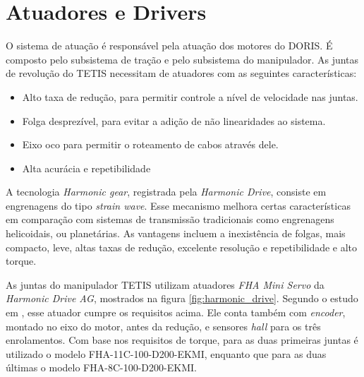 \section{Atuadores e Drivers}

O sistema de atuação é responsável pela atuação dos motores do DORIS. É composto pelo subsistema de tração e pelo subsistema do manipulador. As juntas de revolução do TETIS necessitam de atuadores com as seguintes características:

\begin{itemize}
\item Alto taxa de redução, para permitir controle a nível de velocidade nas juntas.
\item Folga desprezível, para evitar a adição de não linearidades ao sistema. 
\item Eixo oco para permitir o roteamento de cabos através dele.
\item Alta acurácia e repetibilidade
\end{itemize}

A tecnologia \textit{Harmonic gear}, registrada pela \textit{Harmonic Drive}, consiste em engrenagens do tipo \textit{strain wave}. Esse mecanismo melhora certas características em comparação com sistemas de transmissão tradicionais como engrenagens helicoidais, ou planetárias. As vantagens incluem a inexistência de folgas, mais compacto, leve, altas taxas de redução, excelente resolução e repetibilidade e alto torque.

As juntas do manipulador TETIS utilizam atuadores \textit{FHA Mini Servo} da \textit{Harmonic Drive AG}, mostrados na figura \ref{fig:harmonic_drive}. Segundo o estudo em \citep{xaud2016doris}, esse atuador cumpre os requisitos acima. Ele conta também com \textit{encoder}, montado no eixo do motor, antes da redução, e sensores \textit{hall} para os três enrolamentos. Com base nos requisitos de torque, para as duas primeiras juntas é utilizado o modelo FHA-11C-100-D200-EKMI, enquanto que para as duas últimas o modelo FHA-8C-100-D200-EKMI.

\newlength{\twosubht}
\newsavebox{\twosubbox}

